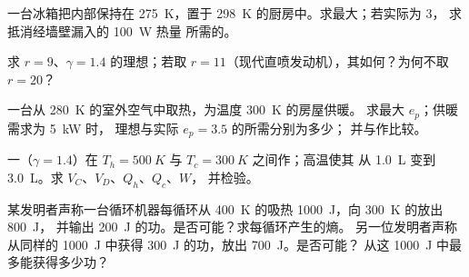 \begin{exercise}[$\star$]\label{exo:b1:heat-engines:2}
一台冰箱把内部保持在 \qty{275}{K}，置于
\qty{298}{K} 的厨房中。求最大；若实际为 $3$，
求抵消经墙壁漏入的 \qty{100}{W} 热量
所需的。
\end{exercise}

\begin{exercise}[$\star$]\label{exo:b1:heat-engines:3}
求 $r = 9$、$\gamma = 1.4$ 的理想；若取
$r = 11$（现代直喷发动机），其如何？为何不取 $r = 20$？
\end{exercise}

\begin{exercise}[$\star$]\label{exo:b1:heat-engines:4}
一台从 \qty{280}{K} 的室外空气中取热，为温度 \qty{300}{K} 的房屋供暖。
求最大 $e_p$；供暖需求为 \qty{5}{kW} 时，
理想与实际 $e_p = 3.5$ 的所需分别为多少；
并与作比较。
\end{exercise}

\begin{exercise}[$\star\star$]\label{exo:b1:heat-engines:5}
一（$\gamma = 1.4$）在
$T_h = \qty{500}{K}$ 与 $T_c = \qty{300}{K}$ 之间作；高温使其
从 \qty{1.0}{L} 变到 \qty{3.0}{L}。求 $V_C$、$V_D$、$Q_h$、$Q_c$、$W$，
并检验。
\end{exercise}

\begin{exercise}[$\star\star$]\label{exo:b1:heat-engines:6}
某发明者声称一台循环机器每循环从
\qty{400}{K} 的吸热 \qty{1000}{J}，向 \qty{300}{K} 的放出 \qty{800}{J}，
并输出 \qty{200}{J} 的功。是否可能？求每循环产生的熵。
另一位发明者声称从同样的
\qty{1000}{J} 中获得 \qty{300}{J} 的功，放出 \qty{700}{J}。是否可能？
从这 \qty{1000}{J} 中最多能获得多少功？
\end{exercise}

